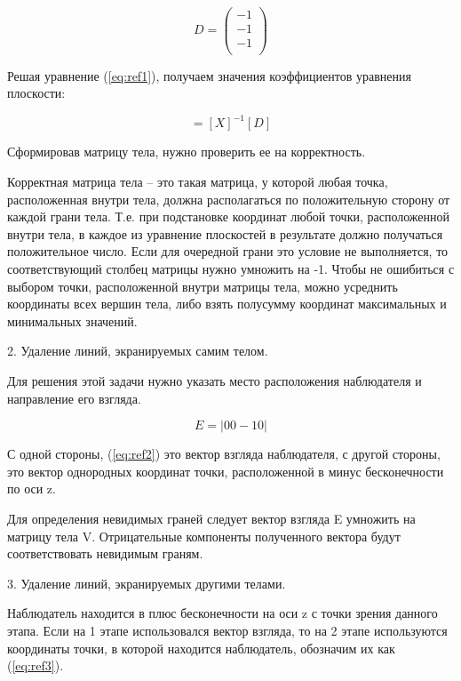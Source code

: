 ~

\begin{equation}
	D = \left(
	\begin{array}{c}
			-1 \\
			-1 \\
			-1 \\
		\end{array}
	\right)
\end{equation}

Решая уравнение (\ref{eq:ref1}), получаем значения коэффициентов уравнения плоскости:

\begin{equation}
	[C] = [X]^{-1}[D]
\end{equation}

Сформировав матрицу тела, нужно проверить ее на корректность.

Корректная матрица тела -- это такая матрица, у которой любая точка, расположенная внутри тела, должна располагаться по положительную сторону от каждой грани тела.
Т.е. при подстановке координат любой точки, расположенной внутри тела, в каждое из уравнение плоскостей в результате должно получаться положительное число. Если для очередной грани это условие не выполняется, то соответствующий столбец матрицы нужно умножить на -1. Чтобы не ошибиться с выбором точки, расположенной внутри матрицы тела, можно усреднить координаты всех вершин тела, либо взять полусумму координат максимальных и минимальных значений.

2. Удаление линий, экранируемых самим телом.

Для решения этой задачи нужно указать место расположения наблюдателя и направление его взгляда.

\begin{equation}
	E = |00-10|
	\label{eq:ref2}
\end{equation}

С одной стороны, (\ref{eq:ref2}) это вектор взгляда наблюдателя, с другой стороны, это вектор однородных координат точки, расположенной в минус бесконечности по оси z.

Для определения невидимых граней следует вектор взгляда E умножить на матрицу тела V.
Отрицательные компоненты полученного вектора будут соответствовать невидимым граням.

3. Удаление линий, экранируемых другими телами.

Наблюдатель находится в плюс бесконечности на оси z с точки зрения данного этапа.
Если на 1 этапе использовался вектор взгляда, то на 2 этапе используются координаты точки, в которой находится наблюдатель, обозначим их как (\ref{eq:ref3}).

